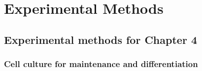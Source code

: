 

\chapter{Experimental Methods}

\section{Experimental methods for Chapter 4}

\subsection{Cell culture for maintenance and differentiation}

